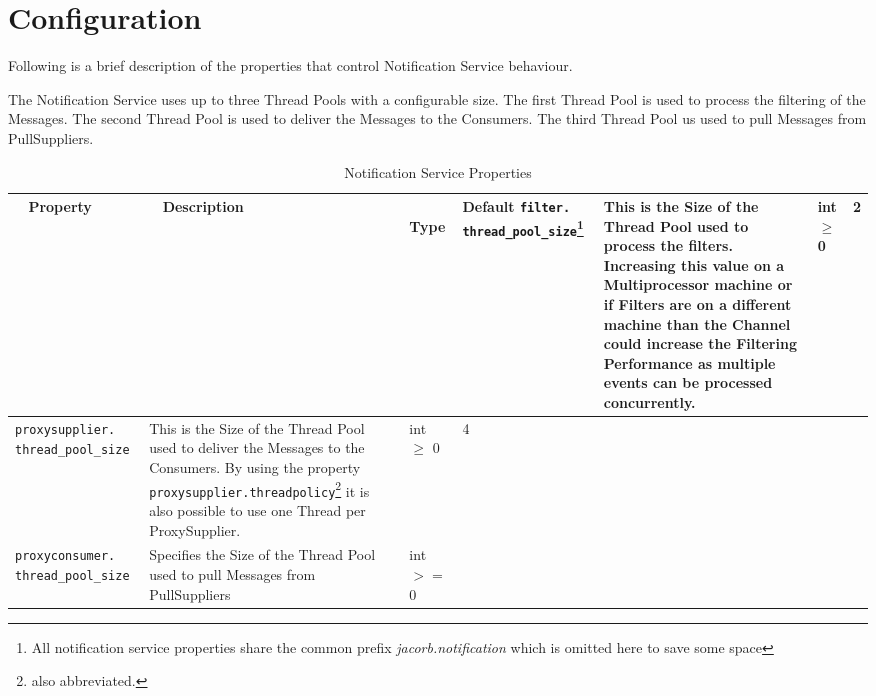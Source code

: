 \section{Configuration}
\label{sec:ntfy-configuration}

Following is a brief description of the properties
that control Notification Service behaviour.

The Notification Service uses up to three Thread Pools with a configurable
size. The first Thread Pool is used to process the filtering of the
Messages. The second Thread Pool is used to deliver the Messages to the
Consumers. The third Thread Pool us used to pull Messages from PullSuppliers.

\begin{small}
  \begin{longtable}{|p{5cm}|p{7.5cm}|p{1.5cm}|p{1.5cm}|}
    \caption{Notification Service Properties}\\
    \hline
    ~ \hfill \textbf {Property} \hfill ~ & ~ \hfill \textbf {Description}
    \hfill ~ & ~ \hfill \textbf {Type} \hfill ~ & \hfill \textbf{Default} \endhead
    \hline
    \verb"filter."
    \verb"thread_pool_size"\footnote{All notification service
    properties share the common prefix \emph{jacorb.notification} which
    is omitted here to save some space} &

    This is the Size of the Thread Pool used to process the filters.
    Increasing this value on a Multiprocessor machine or if Filters are on
    a different machine than the Channel could increase the Filtering
    Performance as multiple events can be processed concurrently. &

    int $\geq$ 0 &

    2 \\
    \hline

    \verb"proxysupplier."
    \verb"thread_pool_size" &

    This is the Size of the Thread Pool used to deliver the Messages to
    the Consumers. By using the property
    \texttt{proxysupplier.threadpolicy}\footnote{also abbreviated.}
    it is also possible to use one Thread per ProxySupplier. &

    int $\geq$ 0 &
    4 \\ \hline

    \verb"proxyconsumer."
    \verb"thread_pool_size" &

    Specifies the Size of the Thread Pool used to pull Messages from
    PullSuppliers &

    int $>=$ 0 &


\end{longtable}
\end{small}
